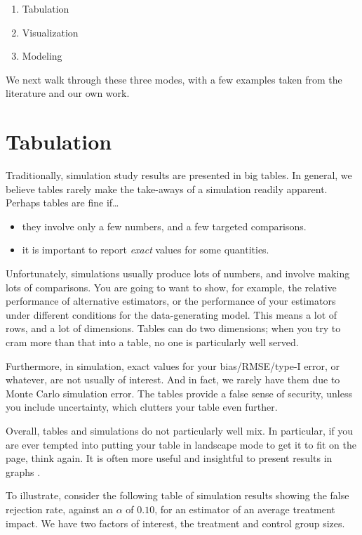 \documentclass[
]{book}
\providecommand{\tightlist}{%
  \setlength{\itemsep}{0pt}\setlength{\parskip}{0pt}}
\begin{document}
\begin{enumerate}
\def\labelenumi{\arabic{enumi}.}
\tightlist
\item
  Tabulation
\item
  Visualization
\item
  Modeling
\end{enumerate}

We next walk through these three modes, with a few examples taken from the literature and our own work.

\section{Tabulation}\label{tabulation}

Traditionally, simulation study results are presented in big tables.
In general, we believe tables rarely make the take-aways of a simulation readily apparent.
Perhaps tables are fine if\ldots{}

\begin{itemize}
\tightlist
\item
  they involve only a few numbers, and a few targeted comparisons.
\item
  it is important to report \emph{exact} values for some quantities.
\end{itemize}

Unfortunately, simulations usually produce lots of numbers, and involve making lots of comparisons.
You are going to want to show, for example, the relative performance of alternative estimators, or the performance of your estimators under different conditions for the data-generating model.
This means a lot of rows, and a lot of dimensions.
Tables can do two dimensions; when you try to cram more than that into a table, no one is particularly well served.

Furthermore, in simulation, exact values for your bias/RMSE/type-I error, or whatever, are not usually of interest. And in fact, we rarely have them due to Monte Carlo simulation error.
The tables provide a false sense of security, unless you include uncertainty, which clutters your table even further.

Overall, tables and simulations do not particularly well mix.
In particular, if you are ever tempted into putting your table in landscape mode to get it to fit on the page, think again.
It is often more useful and insightful to present results in graphs \citep{gelman2002let}.

To illustrate, consider the following table of simulation results showing the false rejection rate, against an \(\alpha\) of \(0.10\), for an estimator of an average treatment impact.
We have two factors of interest, the treatment and control group sizes.
\end{document}
